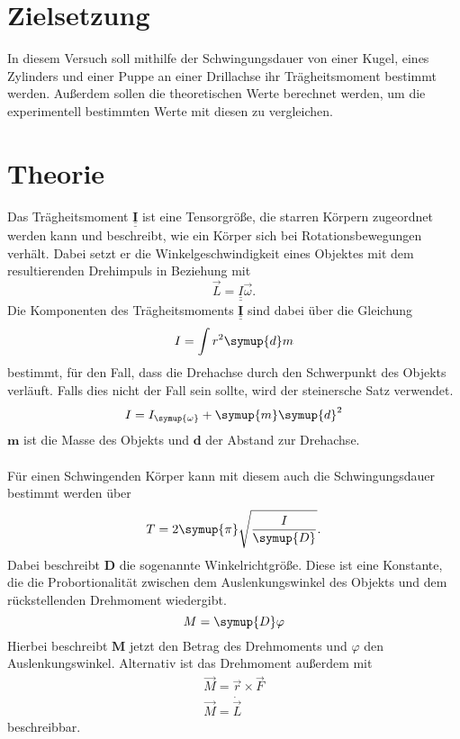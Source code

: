 \section{Zielsetzung}
In diesem Versuch soll mithilfe der Schwingungsdauer von einer Kugel, eines Zylinders und einer Puppe 
an einer Drillachse ihr Trägheitsmoment bestimmt werden.
Außerdem sollen die theoretischen Werte berechnet werden, um die experimentell bestimmten Werte mit diesen zu vergleichen.\\

\section{Theorie}
\label{sec:Theorie}

Das Trägheitsmoment $\symbf{\underline{\underline{I}}}$ ist eine Tensorgröße, die starren Körpern zugeordnet werden kann und 
beschreibt, wie ein Körper sich bei Rotationsbewegungen verhält.
Dabei setzt er die Winkelgeschwindigkeit eines Objektes mit dem resultierenden Drehimpuls in Beziehung mit
\begin{equation}
    \vec{L}=\underline{\underline{I}} \vec{\omega} \text{.}
    \label{eqn:Dreh1}
\end{equation}
Die Komponenten des Trägheitsmoments $\symbf{\underline{\underline{I}}}$ sind dabei über die Gleichung
\begin{equation}
    I=\int r^2 \symup{d}m
    \label{eqn:Trägheit}
\end{equation}
bestimmt, für den Fall, dass die Drehachse durch den Schwerpunkt des Objekts verläuft. 
Falls dies nicht der Fall sein sollte, wird der steinersche Satz verwendet.
\begin{equation}
    I=I_{\symup{\omega}}+\symup{m} \symup{d}^2
    \label{eqn:Steiner}
\end{equation}   
$\symbf{m}$ ist die Masse des Objekts und $\symbf{d}$ der Abstand zur Drehachse. \\
\\
Für einen Schwingenden Körper kann mit diesem auch die Schwingungsdauer bestimmt werden über
\begin{equation}
    T=2 \symup{\pi} \sqrt{\frac{I}{\symup{D}}}\text{.}
    \label{eqn:Schwingungsdauer}
\end{equation}
Dabei beschreibt $\symbf{D}$ die sogenannte Winkelrichtgröße. Diese ist eine Konstante, die die Probortionalität zwischen dem 
Auslenkungswinkel des Objekts und dem rückstellenden Drehmoment wiedergibt.
\begin{equation}
    M=\symup{D} \varphi %
    \label{eqn:Drehmom1}
\end{equation} 
Hierbei beschreibt $\symbf{M}$ jetzt den Betrag des Drehmoments und $\varphi$ den Auslenkungswinkel.
Alternativ ist das Drehmoment außerdem mit
\begin{gather}
    \vec{M}=\vec{r} \times \vec{F} \\ \vec{M}=\dot{\vec{L}}
    \label{eqn:Drehmom2}
\end{gather}
beschreibbar.

